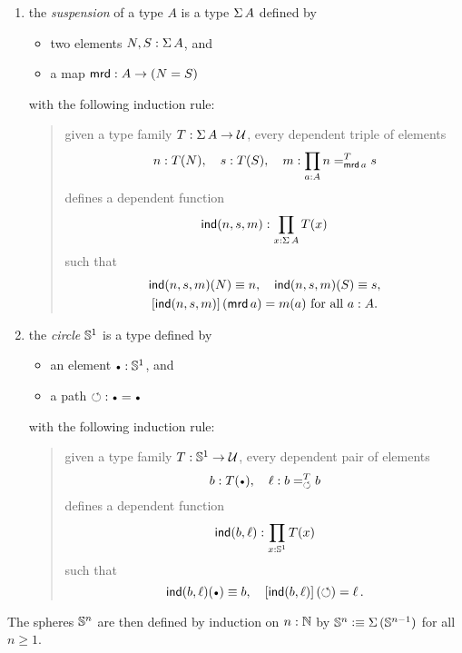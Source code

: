 \documentclass[english,a4]{article}
\renewcommand{\ap}[1]{\left[{#1}\right]}
\begin{document}
\begin{enumerate}
\item the {\em suspension} of a type $A$ is a type $\operatorname{\Sigma} A$ defined
  by
  \begin{itemize}
  \item two elements $N,S: \operatorname{\Sigma} A$, and
  \item a  map $\operatorname{\mathsf{mrd}} : A \to (N=S)$
  \end{itemize}
  with the following induction rule:
  \begin{quote}
    given a type family $T: \operatorname{\Sigma} A \to \mathcal{U}$, every dependent
    triple of elements
    \begin{displaymath}
      n: T(N), \quad s: T(S),\quad
      m: \prod_{a: A}n =^{T}_{\operatorname{\mathsf{mrd}} a} s
    \end{displaymath}
    defines a dependent function
    \begin{displaymath}
      \operatorname{\mathsf{ind}}(n,s,m):\prod_{x: \operatorname{\Sigma} A} T(x)
    \end{displaymath}
    such that
    \begin{gather*}
      \ind(n,s,m)(N) \jdeq n,\quad \ind(n,s,m)(S) \jdeq s,\\
      \ap{\ind(n,s,m)}(\mrd a) = m(a)\ \text{for all}\ a\from A.
    \end{gather*}
  \end{quote}
\item the {\em circle} ${{\mathbb S^{1}}}$ is a type defined by
  \begin{itemize}
  \item an element $\base \from \Sc$, and
  \item a path $\Sloop: \base = \base$
  \end{itemize}
  with the following induction rule:
  \begin{quote}
    given a type family $T: {{\mathbb S^{1}}} \to \mathcal{U}$, every dependent pair of
    elements
    \begin{displaymath}
      b\from T(\base), \quad \ell\from \pathover b T \Sloop b
    \end{displaymath}
    defines a dependent function
    \begin{displaymath}
      \operatorname{\mathsf{ind}}(b,\ell):\prod_{x: {{\mathbb S^{1}}}} T(x)
    \end{displaymath}
    such that
    \begin{displaymath}
      \ind(b,\ell)(\base) \jdeq b,\quad \ap{\ind(b,\ell)}(\Sloop) = \ell \,.
    \end{displaymath}
  \end{quote}
\end{enumerate}
The spheres ${\mathbb S^{n}}$ are then defined by induction on $n:\mathbb{N}$ by
${\mathbb S^{n}} \vcentcolon\equiv \operatorname{\Sigma} {({\mathbb S^{n-1}})}$ for all $n\geq 1$.
\end{document}
